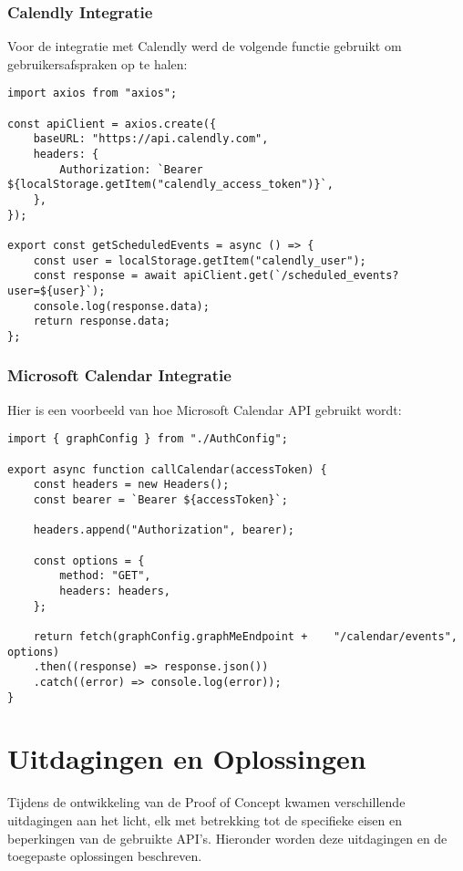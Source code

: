 \subsubsection{Calendly Integratie}

Voor de integratie met Calendly werd de volgende functie gebruikt om gebruikersafspraken op te halen:

\begin{verbatim}
import axios from "axios";

const apiClient = axios.create({
    baseURL: "https://api.calendly.com",
    headers: {
        Authorization: `Bearer ${localStorage.getItem("calendly_access_token")}`,
    },
});

export const getScheduledEvents = async () => {
    const user = localStorage.getItem("calendly_user");
    const response = await apiClient.get(`/scheduled_events?user=${user}`);
    console.log(response.data);
    return response.data;
};
\end{verbatim}

\subsubsection{Microsoft Calendar Integratie}

Hier is een voorbeeld van hoe Microsoft Calendar API gebruikt wordt:

\begin{verbatim}
import { graphConfig } from "./AuthConfig";
    
export async function callCalendar(accessToken) {
    const headers = new Headers();
    const bearer = `Bearer ${accessToken}`;
    
    headers.append("Authorization", bearer);
    
    const options = {
        method: "GET",
        headers: headers,
    };
    
    return fetch(graphConfig.graphMeEndpoint +    "/calendar/events", options)
    .then((response) => response.json())
    .catch((error) => console.log(error));
}
\end{verbatim}

\section{Uitdagingen en Oplossingen}

Tijdens de ontwikkeling van de Proof of Concept kwamen verschillende uitdagingen aan het licht, elk met betrekking tot de specifieke eisen en beperkingen van de gebruikte API's. Hieronder worden deze uitdagingen en de toegepaste oplossingen beschreven.

